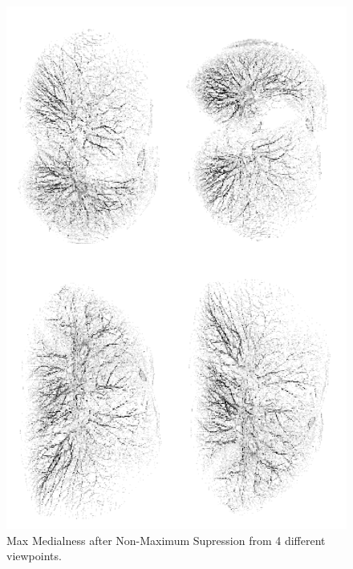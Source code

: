 \begin{figure}[h!]
 \centering
 \includegraphics[width=15cm,keepaspectratio=true]{./figures/nonmaxima-white.png}
 \caption{Max Medialness after Non-Maximum Supression from 4 different viewpoints.}
 \label{fig:nonmaxima}
\end{figure}


